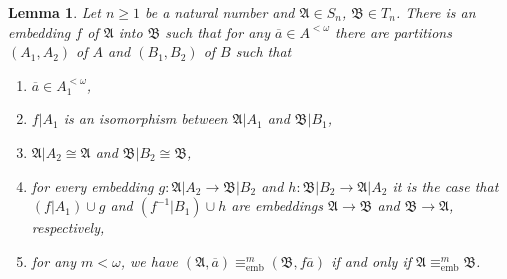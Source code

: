 \documentclass{ndjflart}
\theoremstyle{plain}
\newtheorem{lemma}[conjecture]{Lemma}
\theoremstyle{definition}
\numberwithin{equation}{section}
\DeclareMathOperator{\emb}{emb}
\begin{document}
\begin{lemma}\label{right_emb}
	Let $n \geq 1$ be a natural number and $\mathfrak{A} \in S_n$, $\mathfrak{B}\in T_n$.
	There is an embedding $f$ of $\mathfrak{A}$ into $\mathfrak{B}$ such that for any $\overline{a} \in A^{<\omega}$ there are partitions $(A_1, A_2)$ of $A$ and $(B_1, B_2)$ of $B$ such that
	\begin{enumerate}
		\item $\overline{a} \in A_1^{<\omega}$,
		\item $f | A_1$ is an isomorphism between $\mathfrak{A} | A_1$ and $\mathfrak{B} | B_1$,
		\item $\mathfrak{A} | A_2 \cong \mathfrak{A}$ and $\mathfrak{B}|B_2 \cong \mathfrak{B}$,
		\item for every embedding $g \colon \mathfrak{A}|A_2\rightarrow \mathfrak{B}|B_2$ and $h \colon \mathfrak{B} |B_2 \rightarrow \mathfrak{A}|A_2$ it is the case that $(f|A_1) \cup g$ and $(f^{-1}|B_1) \cup h$ are embeddings $\mathfrak{A} \rightarrow \mathfrak{B}$ and $\mathfrak{B} \rightarrow \mathfrak{A}$, respectively,
		\item for any $m < \omega$, we have $(\mathfrak{A}, \overline{a}) \equiv^m_{\emb} (\mathfrak{B}, f\overline{a})$ if and only if $\mathfrak{A} \equiv^m_{\emb} \mathfrak{B}$.
	\end{enumerate}
\end{lemma}
\end{document}

